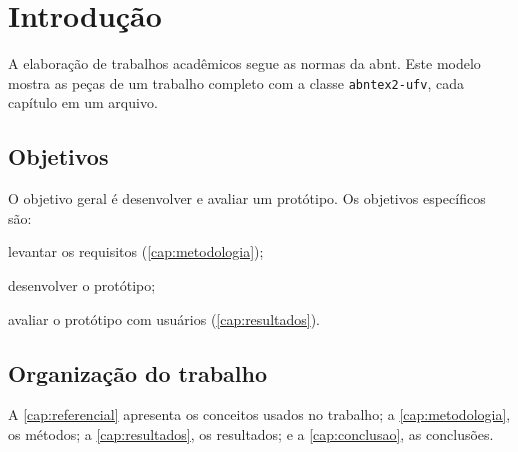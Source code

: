 \chapter{Introdução}\label{cap:introducao}

A elaboração de trabalhos acadêmicos segue as normas da \ac{abnt}. Este
modelo mostra as peças de um trabalho completo com a classe
\texttt{abntex2-ufv}, cada capítulo em um arquivo.

\section{Objetivos}\label{sec:objetivos}

O objetivo geral é desenvolver e avaliar um protótipo. Os objetivos
específicos são:
\begin{alineas}
  \item levantar os requisitos (\autoref{cap:metodologia});
  \item desenvolver o protótipo;
  \item avaliar o protótipo com usuários (\autoref{cap:resultados}).
\end{alineas}

\section{Organização do trabalho}

A \autoref{cap:referencial} apresenta os conceitos usados no trabalho; a
\autoref{cap:metodologia}, os métodos; a \autoref{cap:resultados}, os
resultados; e a \autoref{cap:conclusao}, as conclusões.
